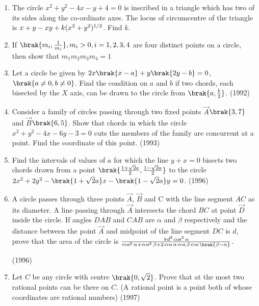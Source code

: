 \begin{enumerate}
%
\hfill {}
\item The circle $x^2+y^2-4x-y+4=0$ is inscribed in a triangle which has two of its sides along the co-ordinate axes. The locus of circumcentre of the triangle is $x+y-xy+k(x^2+y^2)\textsuperscript{1/2}$. Find $k$.
%
\hfill {}
\item If $\brak{ m_i,  \frac{1}{m_i}},  m_i > 0,  i = 1,  2,  3,  4$ are four distinct points on a circle,  then show that $m_1m_2m_3m_4=1$
%
\hfill {}
	\item Let a circle be given by $2x\brak{x-a}+y\brak{2y-b}=0$, $\brak{a\neq0, b\neq0}$. Find the condition on $a$ and $b$ if two chords,  each bisected by the $X$ axis, can be drawn to the circle from $\brak{a, \frac{b}{2}}$.                         
%
\hfill(1992)
%
%
%
%
\item Consider a family of circles passing through two fixed points $\vec{A}$$\brak{3, 7}$ and $\vec{B}$$\brak{6, 5}$. Show that chords in which the circle $x^2+y^2-4x-6y-3=0$ cuts the members of the family are concurrent at a point. Find the coordinate of this point.
%
\hfill(1993)
%
%
%
%
%
%
\item Find the intervals of values of $a$ for which the line $y+x=0$ bisects two chords drawn from a point $\brak {\frac{1+\sqrt{2}a}{2}, \frac{1-\sqrt{2}a}{2}}$ to the circle $2x^2+2y^2-\brak{1+\sqrt{2}a}x-\brak{1-\sqrt{2}a}y=0$.  
%
\hfill(1996)
%
\item A circle passes through three points $\vec{A}$, $\vec{B}$ and C with the line segment $AC$ as its diameter. A line passing through $\vec{A}$ intersects the chord $BC$ at point $\vec{D}$ inside the circle. If angles $DAB$ and $CAB$ are $\alpha$ and $\beta$ respectively and the distance between the point $\vec{A}$ and midpoint of the line segment $DC$ is $d$,  prove that the area of the circle is $\frac{\pi d^2 \cos^2{\alpha} }{\cos^2{\alpha}+\cos^2{\beta}+ 2\cos{\alpha} \cos{\beta} \cos{\brak{\beta-\alpha}}}$.        
%

\hfill(1996)
%
%
%
%
%
\item Let $C$ be any circle with centre $\brak{0, \sqrt{2}}$. Prove that at the most two rational points can be there on $C$. (A rational point is a point both of whose coordinates are rational numbers)
%
\hfill(1997)
%
%
%
%
%
%
%
%
%
%
%
\end{enumerate}
